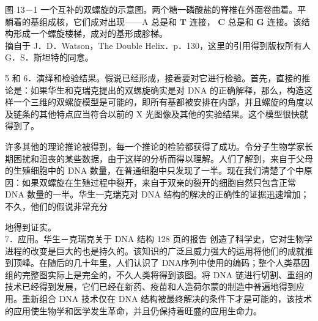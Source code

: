 图 13－1 一个互补的双螺旋的示意图。两个糖一磷酸盐的脊椎在外面卷曲着。平躺着的基组成核，它们成对出现——A 总是和 $\mathbf{T}$ 连接， $\mathbf{C}$ 总是和 $\mathbf{G}$ 连接。该结构形成一个螺旋楼梯，成对的基形成胗梯。\\
摘自于 J．D．Watson，The Double Helix．p．130，这里的引用得到版权所有人 G．S．斯坦特的同意。

5 和 6．演绎和检验结果。假说已经形成，接着要对它进行检验。首先，直接的推论是：如果华生和克瑞克提出的双螺旋确实是对 DNA 的正确解释，那么，构造这样一个三维的双螺旋模型是可能的，即所有基都被安排在内部，并且螺旋的角度以及链条的其他特点应当符合以前的 X 光图像及其他的实验结果。这个模型很快就得到了。

许多其他的理论推论被得到，每一个推论的检验都获得了成功。令分子生物学家长期困扰和沮丧的某些数据，由于这样的分析而得以理解。人们了解到，来自于父母的生殖细胞中的 DNA 数量，在普通细胞中只发现了一半。现在我们清楚了个中原因：如果双螺旋在生殖过程中裂开，来自于双亲的裂开的细胞自然只包含正常 DNA 数量的一半。华生一克瑞克对 DNA 结构的解决的正确性的证据迅速增加；不久，他们的假说非常充分

地得到证实。\\
7．应用。华生－克瑞克关于 DNA 结构 128 页的报告\cite{watson1953} 创造了科学史，它对生物学进程的改变是巨大的也是持久的。该知识的广泛且威力强大的运用将他们的成就推到顶峰。在随后的几十年里，人们认识了 DNA序列中使用的编码；整个人类基因组的完整图实际上是完全的，不久人类将得到该图。将 DNA 链进行切割、重组的技术已经得到发展，它们已经在新药、疫苗和人造荷尔蒙的制造中普遍地得到应用。重新组合 DNA 技术仅在 DNA 结构被最终解决的条件下才是可能的，该技术的应用使生物学和医学发生革命，并且仍保持着旺盛的应用生命力。 

